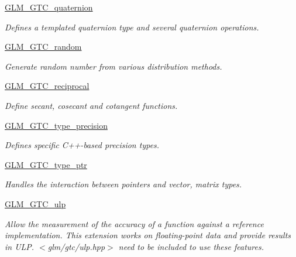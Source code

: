 \begin{CompactItemize}
\item 
\hyperlink{group__gtc__quaternion}{GLM\_\-GTC\_\-quaternion}
\begin{CompactList}\small\item\em Defines a templated quaternion type and several quaternion operations. \item\end{CompactList}

\item 
\hyperlink{group__gtc__random}{GLM\_\-GTC\_\-random}
\begin{CompactList}\small\item\em Generate random number from various distribution methods. \item\end{CompactList}

\item 
\hyperlink{group__gtc__reciprocal}{GLM\_\-GTC\_\-reciprocal}
\begin{CompactList}\small\item\em Define secant, cosecant and cotangent functions. \item\end{CompactList}

\item 
\hyperlink{group__gtc__type__precision}{GLM\_\-GTC\_\-type\_\-precision}
\begin{CompactList}\small\item\em Defines specific C++-based precision types. \item\end{CompactList}

\item 
\hyperlink{group__gtc__type__ptr}{GLM\_\-GTC\_\-type\_\-ptr}
\begin{CompactList}\small\item\em Handles the interaction between pointers and vector, matrix types. \item\end{CompactList}

\item 
\hyperlink{group__gtc__ulp}{GLM\_\-GTC\_\-ulp}
\begin{CompactList}\small\item\em Allow the measurement of the accuracy of a function against a reference implementation. This extension works on floating-point data and provide results in ULP. $<$glm/gtc/ulp.hpp$>$ need to be included to use these features. \item\end{CompactList}


\end{CompactItemize}
